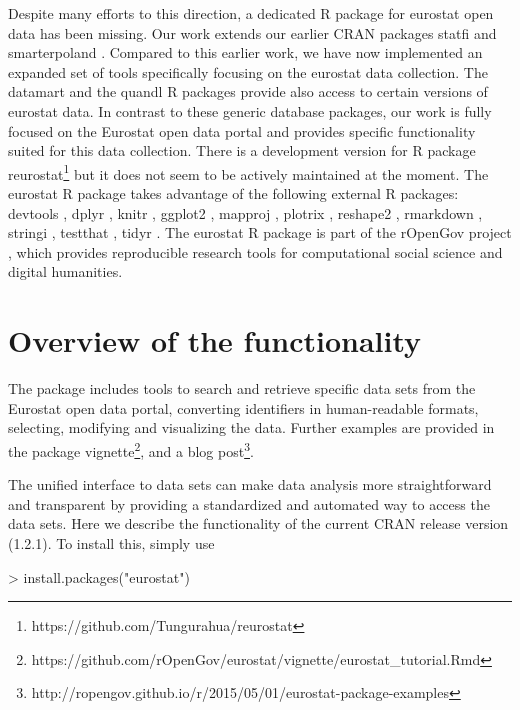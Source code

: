 Despite many efforts to this direction, a dedicated R package for
eurostat open data has been missing. Our work extends our earlier CRAN
packages statfi \citep{statfi} and
smarterpoland \citep{smarterpoland}. Compared to this earlier work, we
have now implemented an expanded set of tools specifically focusing on
the eurostat data collection. The datamart \citep{datamart} and the
quandl \citep{quandl} R packages provide also access to certain
versions of eurostat data. In contrast to these generic database
packages, our work is fully focused on the Eurostat open data portal
and provides specific functionality suited for this data
collection. There is a development version for R package
reurostat\footnote{https://github.com/Tungurahua/reurostat} but it
does not seem to be actively maintained at the moment. The eurostat R
package takes advantage of the following external R packages:
devtools \citep{devtools}, dplyr \citep{dplyr}, knitr \citep{knitr},
ggplot2 \citep{ggplot2}, mapproj \citep{mapproj},
plotrix \citep{plotrix}, reshape2 \citep{reshape2},
rmarkdown \citep{rmarkdown}, stringi \citep{stringi},
testthat \citep{testthat}, tidyr \citep{tidyr}. The eurostat R package
is part of the rOpenGov project
\citep{Lahti13icml}, which provides reproducible research
tools for computational social science and digital humanities.


\section{Overview of the functionality}



The package includes tools to search and retrieve specific data sets
from the Eurostat open data portal, converting identifiers in
human-readable formats, selecting, modifying and visualizing the
data. Further examples are provided in the package
vignette\footnote{https://github.com/rOpenGov/eurostat/vignette/eurostat\_tutorial.Rmd},
and a blog
post\footnote{http://ropengov.github.io/r/2015/05/01/eurostat-package-examples}.

The unified interface to data sets can make data analysis more
straightforward and transparent by providing a standardized and
automated way to access the data sets. Here we describe the
functionality of the current CRAN release version (1.2.1). To install
this, simply use

\begin{Schunk}
\begin{Sinput}
> install.packages("eurostat")
\end{Sinput}
\end{Schunk}

